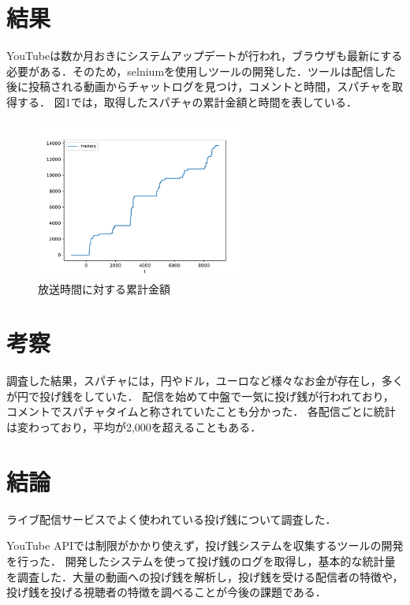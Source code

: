 \documentclass[uplatex,twocolumn,dvipdfmx,10pt]{jsarticle}
\begin{document}
\section{結果}

YouTubeは数か月おきにシステムアップデートが行われ，ブラウザも最新にする必要がある．そのため，selniumを使用しツールの開発した．ツールは配信した後に投稿される動画からチャットログを見つけ，コメントと時間，スパチャを取得する．
図1では，取得したスパチャの累計金額と時間を表している．
\begin{figure}[hbtp]
\begin{center} %
\includegraphics[width=7cm,clip]{livechatlog.pdf}
\caption{放送時間に対する累計金額}\label{time}
\end{center}
\end{figure}


\section{考察}
調査した結果，スパチャには，円やドル，ユーロなど様々なお金が存在し，多くが円で投げ銭をしていた．
配信を始めて中盤で一気に投げ銭が行われており，コメントでスパチャタイムと称されていたことも分かった．
各配信ごとに統計は変わっており，平均が2,000を超えることもある．


\section{結論}
ライブ配信サービスでよく使われている投げ銭について調査した．

YouTube APIでは制限がかかり使えず，投げ銭システムを収集するツールの開発を行った．
開発したシステムを使って投げ銭のログを取得し，基本的な統計量を調査した．大量の動画への投げ銭を解析し，投げ銭を受ける配信者の特徴や，投げ銭を投げる視聴者の特徴を調べることが今後の課題である．






\end{document}
